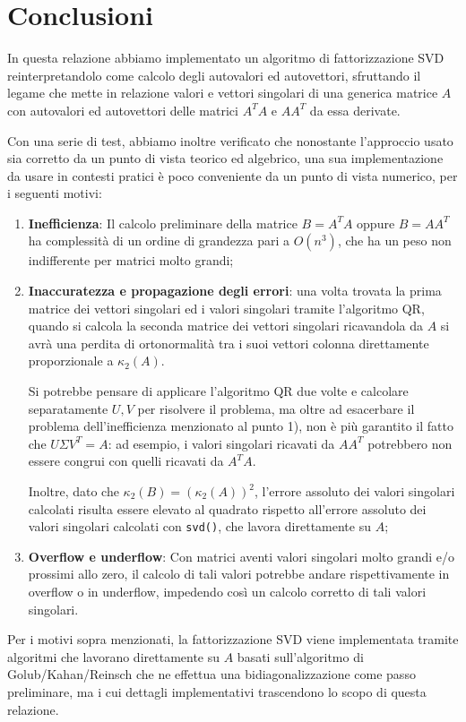 \chapter{Conclusioni}
In questa relazione abbiamo implementato un algoritmo di fattorizzazione 
SVD reinterpretandolo come calcolo degli autovalori ed autovettori, sfruttando 
il legame che mette in relazione valori e vettori singolari di una generica 
matrice $A$ con autovalori ed autovettori delle matrici $A^T A$ e $A A^T$ da 
essa derivate.

Con una serie di test, abbiamo inoltre verificato che nonostante l'approccio 
usato sia corretto da un punto di vista teorico ed algebrico, una sua 
implementazione da usare in contesti pratici è poco conveniente da un punto di 
vista numerico, per i seguenti motivi:
\begin{enumerate}
	\item \textbf{Inefficienza}: Il calcolo preliminare della matrice $B = A^T A$ 
oppure $B = A A^T$ ha complessità di un ordine di grandezza pari a $O(n^3)$, che 
ha un peso non indifferente per matrici molto grandi;
	
	\item \textbf{Inaccuratezza e propagazione degli errori}: una volta trovata la 
prima matrice dei vettori singolari ed i valori singolari tramite l'algoritmo 
QR, quando si calcola la seconda matrice dei vettori singolari ricavandola da 
$A$ si avrà una perdita di ortonormalità tra i suoi vettori colonna direttamente 
proporzionale a $\kappa_2(A)$.
	
	Si potrebbe pensare di applicare l'algoritmo QR due volte e calcolare 
separatamente $U,V$ per risolvere il problema, ma oltre ad esacerbare il 
problema dell'inefficienza menzionato al punto 1), non è più garantito il fatto 
che $U \Sigma V^T = A$: ad esempio, i valori singolari ricavati da $A A^T$ 
potrebbero non essere congrui con quelli ricavati da $A^T A$.
	
	Inoltre, dato che $\kappa_2(B) = (\kappa_2(A))^2$, l'errore assoluto dei valori 
singolari calcolati risulta essere elevato al quadrato rispetto all'errore
assoluto dei valori singolari calcolati con \texttt{svd()}, che lavora
direttamente su $A$;
	
	\item \textbf{Overflow e underflow}: Con matrici aventi valori singolari molto 
grandi e/o prossimi allo zero, il calcolo di tali valori potrebbe andare 
rispettivamente in overflow o in underflow, impedendo così un calcolo corretto 
di tali valori singolari.
\end{enumerate}

Per i motivi sopra menzionati, la fattorizzazione SVD viene implementata tramite 
algoritmi che lavorano direttamente su $A$ basati sull'algoritmo di 
Golub/Kahan/Reinsch che ne effettua una bidiagonalizzazione come passo 
preliminare, ma i cui dettagli implementativi trascendono lo scopo di questa 
relazione.

